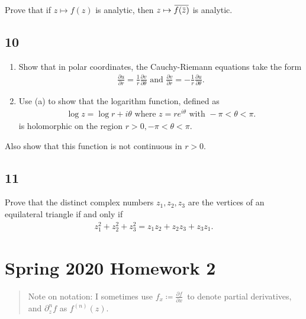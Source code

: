 Prove that if \(z\mapsto f(z)\) is analytic, then
\(z \mapsto \mkern 1.5mu\overline{\mkern-1.5muf(\mkern 1.5mu\overline{\mkern-1.5muz\mkern-1.5mu}\mkern 1.5mu)\mkern-1.5mu}\mkern 1.5mu\)
is analytic.

\hypertarget{section-30}{%
\subsection{10}\label{section-30}}

\begin{enumerate}
\def\labelenumi{\alph{enumi}.}
\item
  Show that in polar coordinates, the Cauchy-Riemann equations take the
  form
  \begin{align*}
    \frac{\partial u}{\partial r}=\frac{1}{r} \frac{\partial v}{\partial \theta} \text { and } \frac{\partial v}{\partial r}=-\frac{1}{r} \frac{\partial u}{\partial \theta}
    .\end{align*}
\item
  Use (a) to show that the logarithm function, defined as
  \begin{align*}
    \log z=\log r+i \theta \text { where } z=r e^{i \theta} \text { with }-\pi<\theta<\pi
    .\end{align*}
  is holomorphic on the region \(r> 0, -\pi < \theta < \pi\).
\end{enumerate}

Also show that this function is not continuous in \(r>0\).

\hypertarget{section-31}{%
\subsection{11}\label{section-31}}

Prove that the distinct complex numbers \(z_1, z_2, z_3\) are the
vertices of an equilateral triangle if and only if
\begin{align*}
z_{1}^{2}+z_{2}^{2}+z_{3}^{2}=z_{1} z_{2}+z_{2} z_{3}+z_{3} z_{1}
.\end{align*}

\hypertarget{spring-2020-homework-2}{%
\section{Spring 2020 Homework 2}\label{spring-2020-homework-2}}

\begin{quote}
Note on notation: I sometimes use
\(f_x \coloneqq{\frac{\partial f}{\partial x}\,}\) to denote partial
derivatives, and \({{\partial}}_z^n f\) as \(f^{(n)}(z)\).
\end{quote}

